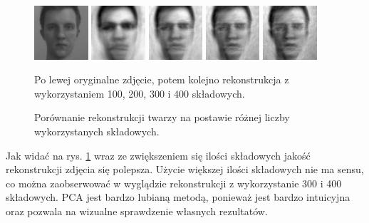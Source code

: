 \documentclass[oneside, eng]{mgr}
\begin{document}
\begin{figure}
\centering
	\parbox{2cm}{
		\includegraphics[width=2cm]{face_1.jpg}
		}
		\qquad
		\begin{minipage}{2cm}
			\includegraphics[width=2cm]{100.jpg}
		\end{minipage}
		\begin{minipage}{2cm}
			\includegraphics[width=2cm]{200.jpg}
		\end{minipage}
		\begin{minipage}{2cm}
			\includegraphics[width=2cm]{300.jpg}
		\end{minipage}
		\begin{minipage}{2cm}
			\includegraphics[width=2cm]{400.jpg}
		\end{minipage}
	\caption{Porównanie rekonstrukcji twarzy na postawie różnej liczby wykorzystanych składowych.} 
	Po lewej oryginalne zdjęcie, potem kolejno rekonstrukcja z wykorzystaniem 100, 200, 300 i 400 składowych.
	\label{fig:rekonstrukcja}
\end{figure}

Jak widać na rys. \ref{fig:rekonstrukcja} wraz ze zwiększeniem się ilości składowych jakość rekonstrukcji zdjęcia się polepsza. Użycie większej ilości składowych nie ma sensu, co można zaobserwować w wyglądzie rekonstrukcji z wykorzystanie 300 i 400 składowych. PCA jest bardzo lubianą metodą, ponieważ jest bardzo intuicyjna oraz pozwala na wizualne sprawdzenie własnych rezultatów.
\end{document}
